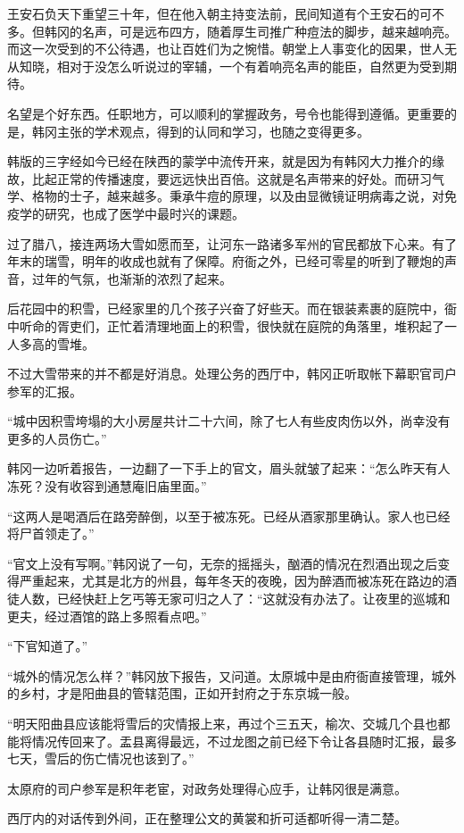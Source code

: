 王安石负天下重望三十年，但在他入朝主持变法前，民间知道有个王安石的可不多。但韩冈的名声，可是远布四方，随着厚生司推广种痘法的脚步，越来越响亮。而这一次受到的不公待遇，也让百姓们为之惋惜。朝堂上人事变化的因果，世人无从知晓，相对于没怎么听说过的宰辅，一个有着响亮名声的能臣，自然更为受到期待。

名望是个好东西。任职地方，可以顺利的掌握政务，号令也能得到遵循。更重要的是，韩冈主张的学术观点，得到的认同和学习，也随之变得更多。

韩版的三字经如今已经在陕西的蒙学中流传开来，就是因为有韩冈大力推介的缘故，比起正常的传播速度，要远远快出百倍。这就是名声带来的好处。而研习气学、格物的士子，越来越多。秉承牛痘的原理，以及由显微镜证明病毒之说，对免疫学的研究，也成了医学中最时兴的课题。

过了腊八，接连两场大雪如愿而至，让河东一路诸多军州的官民都放下心来。有了年末的瑞雪，明年的收成也就有了保障。府衙之外，已经可零星的听到了鞭炮的声音，过年的气氛，也渐渐的浓烈了起来。

后花园中的积雪，已经家里的几个孩子兴奋了好些天。而在银装素裹的庭院中，衙中听命的胥吏们，正忙着清理地面上的积雪，很快就在庭院的角落里，堆积起了一人多高的雪堆。

不过大雪带来的并不都是好消息。处理公务的西厅中，韩冈正听取帐下幕职官司户参军的汇报。

“城中因积雪垮塌的大小房屋共计二十六间，除了七人有些皮肉伤以外，尚幸没有更多的人员伤亡。”

韩冈一边听着报告，一边翻了一下手上的官文，眉头就皱了起来：“怎么昨天有人冻死？没有收容到通慧庵旧庙里面。”

“这两人是喝酒后在路旁醉倒，以至于被冻死。已经从酒家那里确认。家人也已经将尸首领走了。”

“官文上没有写啊。”韩冈说了一句，无奈的摇摇头，酗酒的情况在烈酒出现之后变得严重起来，尤其是北方的州县，每年冬天的夜晚，因为醉酒而被冻死在路边的酒徒人数，已经快赶上乞丐等无家可归之人了：“这就没有办法了。让夜里的巡城和更夫，经过酒馆的路上多照看点吧。”

“下官知道了。”

“城外的情况怎么样？”韩冈放下报告，又问道。太原城中是由府衙直接管理，城外的乡村，才是阳曲县的管辖范围，正如开封府之于东京城一般。

“明天阳曲县应该能将雪后的灾情报上来，再过个三五天，榆次、交城几个县也都能将情况传回来了。盂县离得最远，不过龙图之前已经下令让各县随时汇报，最多七天，雪后的伤亡情况也该到了。”

太原府的司户参军是积年老宦，对政务处理得心应手，让韩冈很是满意。

西厅内的对话传到外间，正在整理公文的黄裳和折可适都听得一清二楚。

